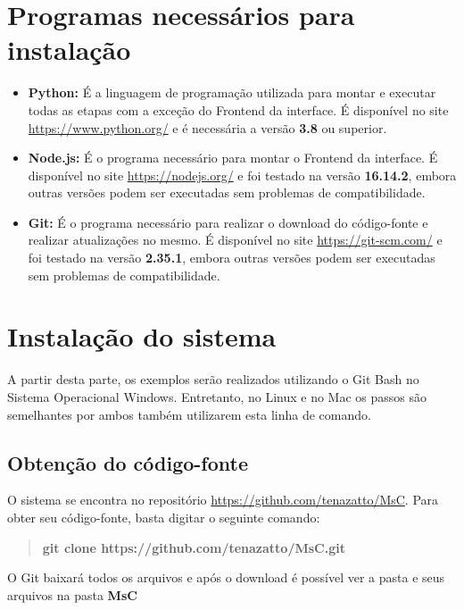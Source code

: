 \documentclass[letterpaper]{article}
\begin{document}
\section{Programas necessários para instalação}

\begin{itemize}
    \item {\textbf{Python:}} É a linguagem de programação utilizada para montar e executar todas as etapas com a exceção do Frontend da interface. É disponível no site \url{https://www.python.org/} e é necessária a versão \textbf{3.8} ou superior.
    \item {\textbf{Node.js:}} É o programa necessário para montar o Frontend da interface. É disponível no site \url{https://nodejs.org/} e foi testado na versão \textbf{16.14.2}, embora outras versões podem ser executadas sem problemas de compatibilidade.
    \item {\textbf{Git:}} É o programa necessário para realizar o download do código-fonte e realizar atualizações no mesmo. É disponível no site \url{https://git-scm.com/} e foi testado na versão \textbf{2.35.1}, embora outras versões podem ser executadas sem problemas de compatibilidade.
\end{itemize}

\section{Instalação do sistema}

A partir desta parte, os exemplos serão realizados utilizando o Git Bash no Sistema Operacional Windows. Entretanto, no Linux e no Mac os passos são semelhantes por ambos também utilizarem esta linha de comando.

\subsection{Obtenção do código-fonte}

O sistema se encontra no repositório \url{https://github.com/tenazatto/MsC}. Para obter seu código-fonte, basta digitar o seguinte comando:

\begin{quote}\textbf{git clone https://github.com/tenazatto/MsC.git}\end{quote}

O Git baixará todos os arquivos e após o download é possível ver a pasta e seus arquivos na pasta \textbf{MsC}
\end{document}
